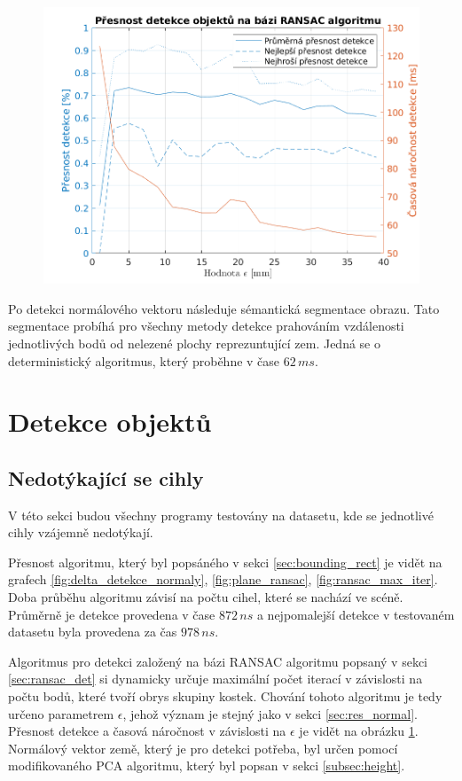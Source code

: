\documentclass[twoside]{ctuthesis}
\begin{document}
\begin{figure}
    \centering
    \includegraphics[width = \linewidth]{pictures/ransac_obj_det.png}
    \caption{}
    \label{fig:ransac_obj_det}
\end{figure}

Po detekci normálového vektoru následuje sémantická segmentace obrazu. Tato segmentace probíhá pro všechny metody detekce prahováním vzdálenosti jednotlivých bodů od nelezené plochy reprezuntující zem. Jedná se o deterministický algoritmus, který proběhne v čase $62\,ms$.

\section{Detekce objektů}
\subsection{Nedotýkající se cihly}
V této sekci budou všechny programy testovány na datasetu, kde se jednotlivé cihly vzájemně nedotýkají.

Přesnost algoritmu, který byl popsáného v sekci \ref{sec:bounding_rect} je vidět na grafech \ref{fig:delta_detekce_normaly}, \ref{fig:plane_ransac}, \ref{fig:ransac_max_iter}. Doba průběhu algoritmu závisí na počtu cihel, které se nachází ve scéně. Průměrně je detekce provedena v čase $872\,ns$ a nejpomalejší detekce v testovaném datasetu byla provedena za čas $978\,ns$.

Algoritmus pro detekci založený na bázi RANSAC algoritmu popsaný v sekci \ref{sec:ransac_det} si dynamicky určuje maximální počet iterací v závislosti na počtu bodů, které tvoří obrys skupiny kostek. Chování tohoto algoritmu je tedy určeno parametrem $\epsilon$, jehož význam je stejný jako v sekci \ref{sec:res_normal}. Přesnost detekce a časová náročnost v závislosti na $\epsilon$ je vidět na obrázku \ref{fig:ransac_obj_det}. Normálový vektor země, který je pro detekci potřeba, byl určen pomocí modifikovaného PCA algoritmu, který byl popsan v sekci \ref{subsec:height}.
\end{document}
